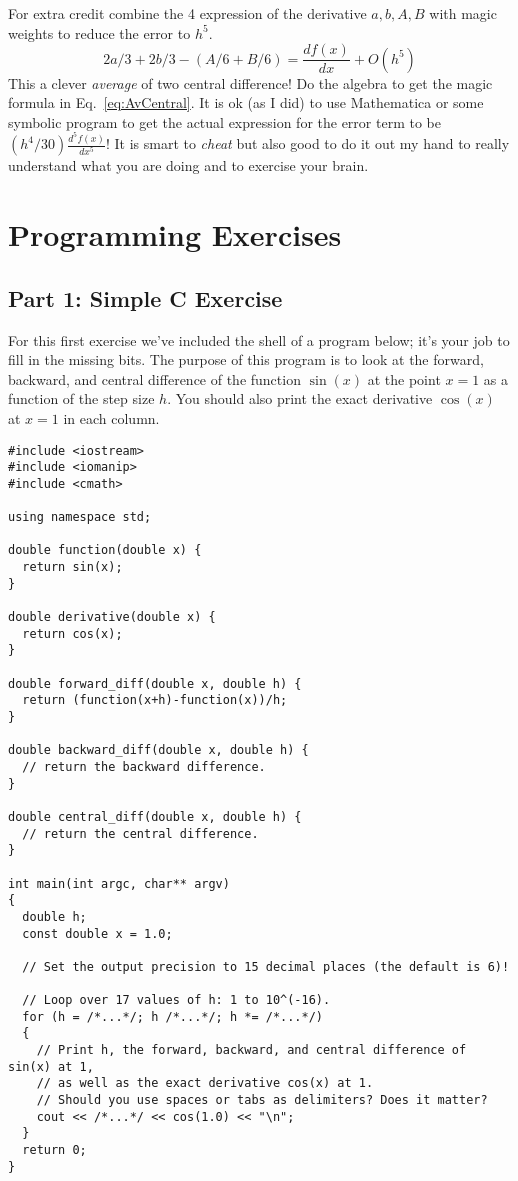 \documentclass[pdftex,letterpaper,12pt]{article}
\newcommand\be{\begin{equation}}
\newcommand\ee{\end{equation}}
\newcommand{\<}{\langle}
\renewcommand{\>}{\rangle}
\begin{document}
For extra credit combine the 4 expression of the derivative $a,b, A,B$
with magic weights to reduce the error to $h^5$.
\be
2 a/3 + 2 b/3 - (A/6 +B/6)  = \frac{df(x)}{dx}  + O(h^5)  
\label{eq:AvCentral}
\ee
This a clever {\em average}  of two central difference!
Do the algebra to get the magic formula in Eq.~\ref{eq:AvCentral}. It is ok (as I did) to 
use Mathematica  or some symbolic program to get the actual expression for the error term to 
be $(h^4/30) \frac{d^5f(x)}{dx^5}$!  It is smart to {\em cheat}  but also good to do it out my hand
to really understand what you are doing and
to exercise your brain.

\section{Programming Exercises}

\subsection{Part 1: Simple C Exercise}

For this first exercise we've included the shell of a program below;
it's your job to fill in the missing bits. The purpose of this program
is to look at the forward, backward, and central difference of the
function $\sin(x)$ at the point $x = 1$ as a function of the step size
$h$. You should also print the exact derivative $\cos(x)$ at  $x = 1$
in each column. 

\begin{verbatim}
#include <iostream>
#include <iomanip>
#include <cmath>

using namespace std;

double function(double x) {
  return sin(x);
}

double derivative(double x) {
  return cos(x);
}

double forward_diff(double x, double h) {
  return (function(x+h)-function(x))/h;
}

double backward_diff(double x, double h) {
  // return the backward difference.
}

double central_diff(double x, double h) {
  // return the central difference.
}

int main(int argc, char** argv)
{
  double h;
  const double x = 1.0;

  // Set the output precision to 15 decimal places (the default is 6)!

  // Loop over 17 values of h: 1 to 10^(-16).
  for (h = /*...*/; h /*...*/; h *= /*...*/)
  {
    // Print h, the forward, backward, and central difference of sin(x) at 1,
    // as well as the exact derivative cos(x) at 1.
    // Should you use spaces or tabs as delimiters? Does it matter?
    cout << /*...*/ << cos(1.0) << "\n";
  }
  return 0;
}
\end{verbatim}
\end{document}
